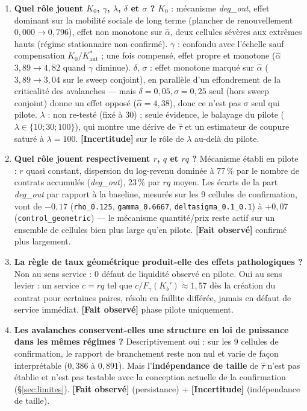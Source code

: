 \documentclass[11pt,a4paper]{article}
\newcommand{\code}[1]{\texttt{#1}}
\newcommand{\Kaut}{K^{*}_{\mathrm{aut}}}
\newcommand{\fait}{\textbf{[Fait observé]}}
\newcommand{\incertitude}{\textbf{[Incertitude]}}
\begin{document}
\begin{enumerate}
\item \textbf{Quel rôle jouent $K_0$, $\gamma$, $\lambda$, $\delta$ et
  $\sigma$ ?} $K_0$ : mécanisme \emph{deg\_out}, effet dominant sur la
  mobilité sociale de long terme (plancher de renouvellement
  $0{,}000\to0{,}796$), effet non monotone sur $\hat\alpha$, deux
  cellules sévères aux extrêmes hauts (régime stationnaire non
  confirmé). $\gamma$ : confondu avec l'échelle sauf compensation
  $K_0/\Kaut$ ; une fois compensé, effet propre et monotone
  ($\hat\alpha$ $3{,}89\to4{,}82$ quand $\gamma$ diminue). $\delta$,
  $\sigma$ : effet monotone marqué sur $\hat\alpha$
  ($3{,}89\to3{,}04$ sur le sweep conjoint), en parallèle d'un
  effondrement de la criticalité des avalanches --- mais
  $\delta=0{,}05,\sigma=0{,}25$ seul (hors sweep conjoint) donne un
  effet opposé ($\hat\alpha=4{,}38$), donc ce n'est pas $\sigma$ seul
  qui pilote. $\lambda$ : non re-testé (fixé à 30) ; seule évidence, le
  balayage du pilote ($\lambda \in \{10;30;100\}$), qui montre une
  dérive de $\hat\tau$ et un estimateur de coupure saturé à
  $\lambda=100$. \incertitude{} sur le rôle de $\lambda$ au-delà du
  pilote.

\item \textbf{Quel rôle jouent respectivement $r$, $q$ et $rq$ ?}
  Mécanisme établi en pilote : $r$ quasi constant, dispersion du
  log-revenu dominée à 77\,\% par le nombre de contrats accumulés
  (\emph{deg\_out}), 23\,\% par $rq$ moyen. Les écarts de la part
  \emph{deg\_out} par rapport à la baseline, mesurés sur les 9 cellules
  de confirmation, vont de $-0{,}17$ (\code{rho\_0.125},
  \code{gamma\_0.6667}, \code{deltasigma\_0.1\_0.1}) à $+0{,}07$
  (\code{control\_geometric}) --- le mécanisme quantité/prix reste actif
  sur un ensemble de cellules bien plus large qu'en pilote. \fait{}
  confirmé plus largement.

\item \textbf{La règle de taux géométrique produit-elle des effets
  pathologiques ?} Non au sens service : 0 défaut de liquidité observé
  en pilote. Oui au sens levier : un service $c=rq$ tel que
  $c/F_\gamma(K_b')\approx1{,}57$ dès la création du contrat pour
  certaines paires, résolu en faillite différée, jamais en défaut de
  service immédiat. \fait{} phase pilote uniquement.

\item \textbf{Les avalanches conservent-elles une structure en loi de
  puissance dans les mêmes régimes ?} Descriptivement oui : sur les 9
  cellules de confirmation, le rapport de branchement reste non nul et
  varie de façon interprétable ($0{,}386$ à $0{,}891$). Mais
  l'\textbf{indépendance de taille} de $\hat\tau$ n'est pas établie et
  n'est pas testable avec la conception actuelle de la confirmation
  (\S\ref{sec:limites}). \fait{} (persistance) + \incertitude{}
  (indépendance de taille).


\end{enumerate}
\end{document}
